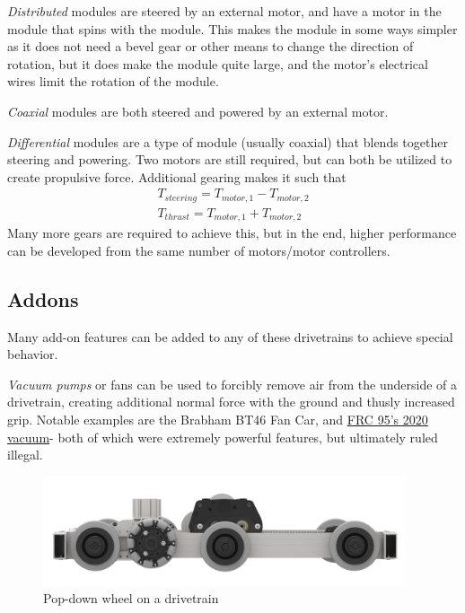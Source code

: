 \begin{asparaenum}[a)]
	\item \textit{Distributed} modules are steered by an external motor, and have a motor in the module that spins with the module. This makes the module in some ways simpler as it does not need a bevel gear or other means to change the direction of rotation, but it does make the module quite large, and the motor's electrical wires limit the rotation of the module.
	\item \textit{Coaxial} modules are both steered and powered by an external motor.
	\item \textit{Differential} modules are a type of module (usually coaxial) that blends together steering and powering. Two motors are still required, but can both be utilized to create propulsive force. Additional gearing makes it such that
	\begin{align}
		T_{steering} = T_{motor, 1} - T_{motor, 2}\\
		T_{thrust}   = T_{motor, 1} + T_{motor, 2}
	\end{align}
	Many more gears are required to achieve this, but in the end, higher performance can be developed from the same number of motors/motor controllers.
\end{asparaenum}

\subsection{Addons}
Many add-on features can be added to any of these drivetrains to achieve special behavior.

\textit{Vacuum pumps} or fans can be used to forcibly remove air from the underside of a drivetrain, creating additional normal force with the ground and thusly increased grip. Notable examples are the Brabham BT46 Fan Car, and \href{https://www.youtube.com/watch?v=O9CEOHX88mw}{\color{red}\underline{FRC 95's 2020 vacuum}}- both of which were extremely powerful features, but ultimately ruled illegal. 

\begin{figure}[H]
	\includegraphics[width=0.95\textwidth]{imgs/drivetrain_popupwheel.png}
	\caption{Pop-down wheel on a drivetrain}
\end{figure}


